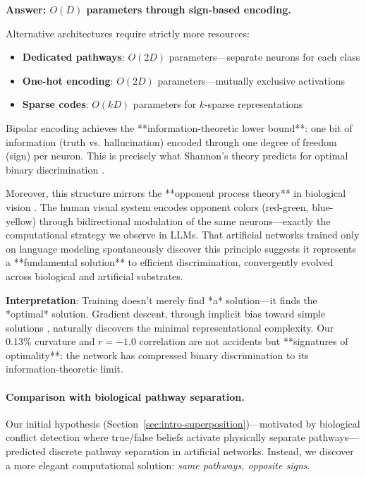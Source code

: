 \documentclass[11pt]{article}
\begin{document}
\textbf{Answer: $O(D)$ parameters through sign-based encoding.}

Alternative architectures require strictly more resources:
\begin{itemize}
\item \textbf{Dedicated pathways}: $O(2D)$ parameters—separate neurons for each class
\item \textbf{One-hot encoding}: $O(2D)$ parameters—mutually exclusive activations
\item \textbf{Sparse codes}: $O(kD)$ parameters for $k$-sparse representations
\end{itemize}

Bipolar encoding achieves the **information-theoretic lower bound**: one bit of information (truth vs. hallucination) encoded through one degree of freedom (sign) per neuron. This is precisely what Shannon's theory predicts for optimal binary discrimination \citep{shannon1948mathematical}.

Moreover, this structure mirrors the **opponent process theory** in biological vision \citep{hurvich1957opponent}. The human visual system encodes opponent colors (red-green, blue-yellow) through bidirectional modulation of the same neurons—exactly the computational strategy we observe in LLMs. That artificial networks trained only on language modeling spontaneously discover this principle suggests it represents a **fundamental solution** to efficient discrimination, convergently evolved across biological and artificial substrates.

\textbf{Interpretation}: Training doesn't merely find *a* solution—it finds the *optimal* solution. Gradient descent, through implicit bias toward simple solutions \citep{soudry2018implicit}, naturally discovers the minimal representational complexity. Our 0.13\% curvature and $r=-1.0$ correlation are not accidents but **signatures of optimality**: the network has compressed binary discrimination to its information-theoretic limit.

\paragraph{Comparison with biological pathway separation.}
Our initial hypothesis (Section~\ref{sec:intro-superposition})---motivated by biological conflict detection where true/false beliefs activate physically separate pathways---predicted discrete pathway separation in artificial networks. Instead, we discover a more elegant computational solution: \textit{same pathways, opposite signs}. 
\end{document}
